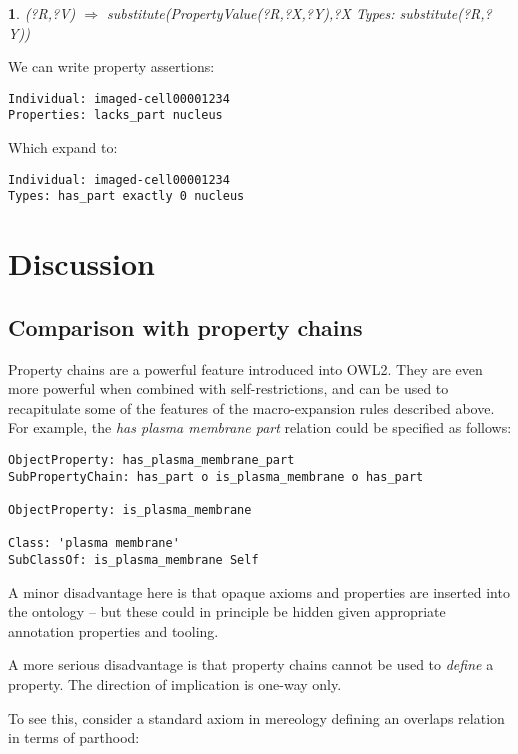 \documentclass{llncs}
\newtheorem{exprule}{}[section]
\begin{document}
\begin{exprule}\label{exp-inst}
(?R,?V)  $\Rightarrow$ \newline
substitute(PropertyValue(?R,?X,?Y),?X Types: substitute(?R,?Y))
\end{exprule}

We can write property assertions:

\begin{verbatim}
Individual: imaged-cell00001234
Properties: lacks_part nucleus
\end{verbatim}

Which expand to:

\begin{verbatim}
Individual: imaged-cell00001234
Types: has_part exactly 0 nucleus
\end{verbatim}

\section{Discussion}

\subsection{Comparison with property chains}

Property chains are a powerful feature introduced into OWL2. They are
even more powerful when combined with self-restrictions, and can be
used to recapitulate some of the features of the macro-expansion rules
described above. For example, the \emph{has plasma membrane part}
relation could be specified as follows:

\begin{verbatim}
ObjectProperty: has_plasma_membrane_part 
SubPropertyChain: has_part o is_plasma_membrane o has_part

ObjectProperty: is_plasma_membrane

Class: 'plasma membrane'
SubClassOf: is_plasma_membrane Self
\end{verbatim}

A minor disadvantage here is that opaque axioms and properties are
inserted into the ontology -- but these could in principle be hidden
given appropriate annotation properties and tooling.

A more serious disadvantage is that property chains cannot be used to
\emph{define} a property. The direction of implication is one-way
only.

To see this, consider a standard axiom in mereology defining an
overlaps relation in terms of parthood:
\end{document}
